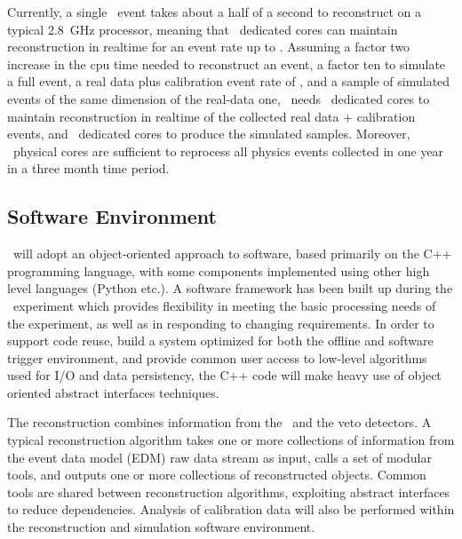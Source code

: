 Currently, a single \DSfs\ event takes about a half of a second to reconstruct on a typical \SI{2.8}{\giga\hertz} processor, meaning that \DSkOffLineCoresRealtimeReconNumber\ dedicated cores can maintain reconstruction in realtime for an event rate up to \DSkComputingRealtimeMaxEventRate.  Assuming a factor two increase in the cpu time needed to reconstruct an event,  a factor ten to simulate a full event, a real data plus calibration event rate of  \DSkRealtimeCalibrationEventRate, and a sample of simulated events of the same dimension of the real-data one, \DSks\ needs \DSkOffLineCoresRealtimeReconNumber\ dedicated cores to maintain reconstruction in realtime of the collected real data + calibration events, and \DSkOffLineCoresSimulationNumber\ dedicated cores to produce the simulated samples. Moreover, \DSkOffLineCoresReprocessOneYearNumber\ physical cores are sufficient to reprocess all physics events collected in one year in a three month time period. 

\subsection{Software Environment}
\DSks\ will adopt an object-oriented approach to software, based primarily on the C++ programming language,  with some components implemented using other high level languages (Python etc.). A software framework has been built up during the \DSfs\ experiment which provides flexibility in meeting the basic processing needs of the experiment, as well as in  responding to changing requirements. In order to support code reuse, build a system optimized for both the offline and software trigger environment, and provide common user access to low-level algorithms used for I/O and data persistency, the C++ code will make heavy use of object oriented abstract interfaces techniques.

The reconstruction combines information from the \TPC\ and the veto detectors. A typical reconstruction algorithm takes one or more collections of information from the event data model (EDM) raw data stream as input, calls a set of modular tools, and outputs one or more collections of reconstructed objects. Common tools are shared between reconstruction algorithms, exploiting abstract interfaces to reduce dependencies.  Analysis of calibration data will also be performed within the reconstruction and simulation software environment. 

